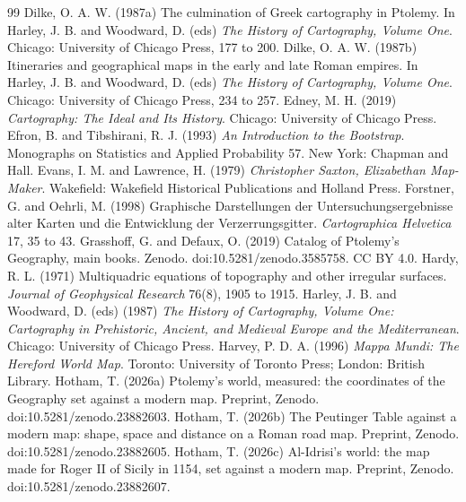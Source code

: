 \documentclass[11pt,a4paper]{article}
\begin{document}
\begin{thebibliography}{99}
 Dilke, O. A. W. (1987a) The culmination of Greek cartography in Ptolemy. In Harley, J. B. and Woodward, D. (eds) \textit{The History of Cartography, Volume One}. Chicago: University of Chicago Press, 177 to 200.
 Dilke, O. A. W. (1987b) Itineraries and geographical maps in the early and late Roman empires. In Harley, J. B. and Woodward, D. (eds) \textit{The History of Cartography, Volume One}. Chicago: University of Chicago Press, 234 to 257.
 Edney, M. H. (2019) \textit{Cartography: The Ideal and Its History}. Chicago: University of Chicago Press.
 Efron, B. and Tibshirani, R. J. (1993) \textit{An Introduction to the Bootstrap}. Monographs on Statistics and Applied Probability 57. New York: Chapman and Hall.
 Evans, I. M. and Lawrence, H. (1979) \textit{Christopher Saxton, Elizabethan Map-Maker}. Wakefield: Wakefield Historical Publications and Holland Press.
 Forstner, G. and Oehrli, M. (1998) Graphische Darstellungen der Untersuchungsergebnisse alter Karten und die Entwicklung der Verzerrungsgitter. \textit{Cartographica Helvetica} 17, 35 to 43.
 Grasshoff, G. and Defaux, O. (2019) Catalog of Ptolemy's Geography, main books. Zenodo. doi:10.5281/zenodo.3585758. CC BY 4.0.
 Hardy, R. L. (1971) Multiquadric equations of topography and other irregular surfaces. \textit{Journal of Geophysical Research} 76(8), 1905 to 1915.
 Harley, J. B. and Woodward, D. (eds) (1987) \textit{The History of Cartography, Volume One: Cartography in Prehistoric, Ancient, and Medieval Europe and the Mediterranean}. Chicago: University of Chicago Press.
 Harvey, P. D. A. (1996) \textit{Mappa Mundi: The Hereford World Map}. Toronto: University of Toronto Press; London: British Library.
 Hotham, T. (2026a) Ptolemy's world, measured: the coordinates of the Geography set against a modern map. Preprint, Zenodo. doi:10.5281/zenodo.23882603.
 Hotham, T. (2026b) The Peutinger Table against a modern map: shape, space and distance on a Roman road map. Preprint, Zenodo. doi:10.5281/zenodo.23882605.
 Hotham, T. (2026c) Al-Idrisi's world: the map made for Roger II of Sicily in 1154, set against a modern map. Preprint, Zenodo. doi:10.5281/zenodo.23882607.

\end{thebibliography}
\end{document}
